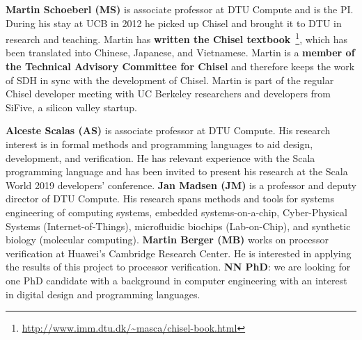 \documentclass[fleqn,12pt]{article}
\begin{document}
{\bf Martin Schoeberl (MS)} is associate professor at DTU Compute and is the PI.
During his stay
at UCB in 2012 he picked up Chisel and brought it to DTU in research and teaching.
Martin has {\bf written the Chisel textbook}~\cite{chisel:book}\footnote{\url{http://www.imm.dtu.dk/~masca/chisel-book.html}}, which has been translated
into Chinese, Japanese, and Vietnamese. Martin is a {\bf member of the Technical Advisory Committee for
Chisel} and therefore keeps the work of SDH in sync with the development of Chisel.
Martin is part of the regular Chisel developer meeting with
UC Berkeley researchers and developers from SiFive, a silicon valley startup.


{\bf Alceste Scalas (AS)} is associate professor at DTU Compute. His research interest is in formal methods and programming languages to aid design, development, and verification. He has relevant experience with the Scala programming language and has been invited to present his research at the Scala World 2019 developers' conference.
{\bf Jan Madsen (JM)} is a professor and deputy director of DTU Compute.
His research spans methods
and tools for systems engineering of computing systems, embedded systems-on-a-chip,
Cyber-Physical Systems (Internet-of-Things), microfluidic biochips (Lab-on-Chip), and
synthetic biology (molecular computing). 
{\bf Martin Berger (MB)} works on processor verification at Huawei's Cambridge Research Center.
He is interested in applying the results of this project to processor verification.
{\bf NN PhD}: we are looking for one PhD candidate with a background in computer engineering
with an interest in digital design and programming languages.

%
\end{document}
